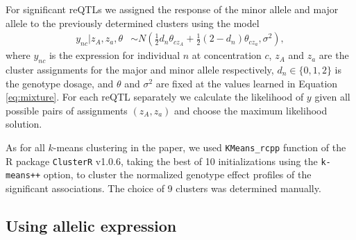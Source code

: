 \documentclass{article}
\begin{document}
For significant reQTLs we assigned the response of the minor allele and major allele to the previously determined clusters using the model
\begin{align*}
y_{nc} | z_A,z_a, \theta &\sim N\left( \frac12 d_n \theta_{cz_A} + \frac12 (2 - d_n) \theta_{cz_a}, \sigma^2 \right),
\end{align*}
where $y_{nc}$ is the expression for individual $n$ at concentration $c$, $z_A$ and $z_a$ are the cluster assignments for the major and minor allele respectively, $d_n \in \{0,1,2\}$ is the genotype dosage, and $\theta$ and $\sigma^2$ are fixed at the values learned in Equation \ref{eq:mixture}. For each reQTL separately we calculate the likelihood of $y$ given all possible pairs of assignments $(z_A,z_a)$ and choose the maximum likelihood solution. 

As for all $k$-means clustering in the paper, we used \texttt{KMeans\_rcpp} function of the R package \texttt{ClusterR} v1.0.6, taking the best of 10 initializations using the \texttt{k-means++} option, to cluster the normalized genotype effect profiles of the significant associations. The choice of 9 clusters was determined manually. 

\subsection*{Using allelic expression} 
\end{document}
